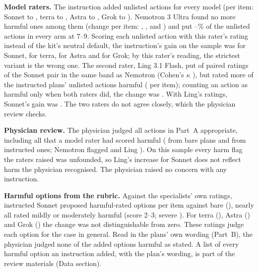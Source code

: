 \documentclass[11pt]{article}
\begin{document}
\textbf{Model raters.} The instruction added unlisted actions for every model (per item: Sonnet
\covAuditActionsBareSonnet{} to \covAuditActionsPromptSonnet{}, terra \covAuditActionsBareTerra{} to
\covAuditActionsPromptTerra{}, Astra \covAuditActionsBareAstra{} to \covAuditActionsPromptAstra{},
Grok \covAuditActionsBareGrok{} to \covAuditActionsPromptGrok{}). Nemotron 3 Ultra found no more
harmful ones among them (change per item: \covAuditHarmDiffSonnet{}, \covAuditHarmDiffTerra{},
\covAuditHarmDiffAstra{} and \covAuditHarmDiffGrok{}) and put
\covRatedOkSonnetNemoBare--\covRatedOkTerraNemoPrompt\% of the unlisted actions in every arm at 7--9.
Scoring each unlisted action with this rater's rating instead of the kit's neutral default, the
instruction's gain on the sample was \covRatedFSonnetNemo{} for Sonnet, \covRatedFTerraNemo{} for
terra, \covRatedFAstraNemo{} for Astra and \covRatedFGrokNemo{} for Grok; by this rater's reading,
the strictest variant is the wrong one. The second rater, Ling 3.1 Flash, put \covAuditAgreeSonnet{}
of \covAuditAgreeActionsSonnet{} paired ratings of the Sonnet pair in the same band as Nemotron
(Cohen's $\kappa$ \covAuditKappaSonnet{}), but rated more of the instructed plans' unlisted actions
harmful (\covAuditHarmDiffSonnetLing{} per item); counting an action as harmful only when both raters
did, the change was \covAuditHarmDiffSonnetBoth{}. With Ling's ratings, Sonnet's gain was
\covRatedFSonnetLing{}. The two raters do not agree closely, which the physician review checks.

\textbf{Physician review.} The physician judged all \covPhysActions{} actions in Part~A appropriate,
including all \covPhysFlagged{} that a model rater had scored harmful (\covPhysFlaggedBare{} from bare
plans and \covPhysFlaggedPrompt{} from instructed ones; Nemotron flagged \covPhysFlaggedNemo{} and Ling
\covPhysFlaggedLing{}). On this sample every harm flag the raters raised was unfounded, so Ling's
increase for Sonnet does not reflect harm the physician recognised. The physician raised no concern
with any instruction.

\textbf{Harmful options from the rubric.} Against the specialists' own ratings, instructed Sonnet
proposed \covHarmSonnetPrompt{} harmful-rated options per item against \covHarmSonnetBare{} bare
(\covHarmSonnetDiff{}), nearly all rated mildly or moderately harmful (score 2--3; severe
\covSevereHarmSonnetDiff{}). For terra (\covHarmTerraDiff{}), Astra (\covHarmAstraDiff{}) and Grok
(\covHarmGrokDiff{}) the change was not distinguishable from zero. These ratings judge each option for
the case in general. Read in the plans' own wording (Part~B), the physician judged none of the
\covPhysOptions{} added options harmful as stated. A list of every harmful option an instruction added, with the plan's wording, is part
of the review materials (Data section).
\end{document}
